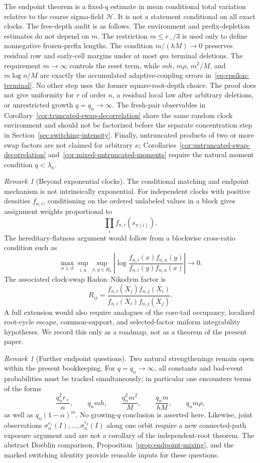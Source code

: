 \documentclass[11pt]{article}
\newcommand{\1}{\mathbf 1}
\newcommand{\cH}{\mathcal H}
\theoremstyle{definition}
\theoremstyle{remark}
\newtheorem{remark}[theorem]{Remark}
\begin{document}
The endpoint theorem is a fixed-$q$ estimate in mean conditional total
variation relative to the coarse sigma-field $\cH$.  It is not a
statement conditional on all exact clocks.  The free-depth audit is as
follows.  The environment and prefix-depletion estimates do not depend on
$m$.  The restriction $m\le r_-/3$ is used only to define nonnegative
frozen-prefix lengths.  The condition $m/(hM)\to0$ preserves residual row
and early-cell margins under at most $qm$ terminal deletions.  The
requirement $m\to\infty$ controls the reset term, while $mh$,
$m\rho$, $m^2/M$, and $m\log n/M$ are exactly the accumulated
adaptive-coupling errors in~\eqref{eq:epsilon-terminal}.  No other step
uses the former square-root-depth choice.  The proof does not give uniformity for $r$ of
order $n$, a residual local law after arbitrary deletions, or unrestricted
growth $q=q_n\to\infty$.  The fresh-pair
observables in Corollary~\ref{cor:truncated-swap-decorrelation} share the
same random clock environment and should not be factorized before the
separate concentration step in Section~\ref{sec:switching-intensity}.
Finally, untruncated products of two or more swap factors are not claimed
for arbitrary $\kappa$; Corollaries~\ref{cor:untruncated-swap-decorrelation}
and~\ref{cor:mixed-untruncated-moments} require the natural moment
condition $q<\lambda_\kappa$.

\begin{remark}[Beyond exponential clocks]
The conditional matching and endpoint mechanism is not intrinsically
exponential.  For independent clocks with positive densities $f_{n,i}$,
conditioning on the ordered unlabeled values in a block gives assignment
weights proportional to
\[
 \prod_i f_{n,i}(s_{\pi(i)}).
\]
The hereditary-flatness argument would follow from a blockwise
cross-ratio condition such as
\[
 \max_{a\leq d}\sup_{i,u}\sup_{x,y\in B_a}
 \left|
  \log\frac{f_{n,i}(x)f_{n,u}(y)}
            {f_{n,i}(y)f_{n,u}(x)}
 \right|\longrightarrow0.
\]
The associated clock-swap Radon--Nikodym factor is
\[
 R_{ij}=
 \frac{f_{n,i}(X_j)f_{n,j}(X_i)}
      {f_{n,i}(X_i)f_{n,j}(X_j)}.
\]
A full extension would also require analogues of the core-tail occupancy,
localized root-cycle escape, common-support, and selected-factor uniform
integrability hypotheses.  We record this only as a roadmap, not as a
theorem of the present paper.
\end{remark}

\begin{remark}[Further endpoint questions]
Two natural strengthenings remain open within the present bookkeeping.
For $q=q_n\to\infty$, all constants and bad-event probabilities must be
tracked simultaneously; in particular one encounters terms of the forms
\[
 \frac{q_n^2r_+}{n},\qquad
 q_nmh,\qquad
 \frac{q_n^2m^2}{M},\qquad
 \frac{q_nm}{hM},\qquad
 q_nm\rho,
\]
as well as $q_n(1-\alpha)^m$.  No growing-$q$ conclusion is asserted
here.  Likewise, joint observations
$\sigma_n^{r_1}(I),\dots,\sigma_n^{r_q}(I)$ along one orbit require a new
connected-path exposure argument and are not a corollary of the
independent-root theorem.  The abstract Doeblin comparison,
Proposition~\ref{prop:endpoint-mixing}, and the marked switching identity
provide reusable inputs for these questions.
\end{remark}
\end{document}
